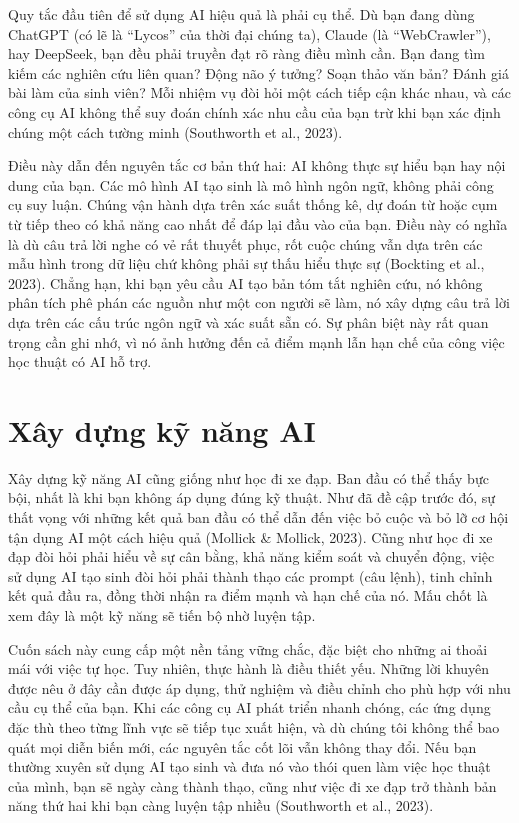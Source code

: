Quy tắc đầu tiên để sử dụng AI hiệu quả là phải cụ thể. Dù bạn đang dùng ChatGPT (có lẽ là ``Lycos'' của thời đại chúng ta), Claude (là ``WebCrawler''), hay DeepSeek, bạn đều phải truyền đạt rõ ràng điều mình cần. Bạn đang tìm kiếm các nghiên cứu liên quan? Động não ý tưởng? Soạn thảo văn bản? Đánh giá bài làm của sinh viên? Mỗi nhiệm vụ đòi hỏi một cách tiếp cận khác nhau, và các công cụ AI không thể suy đoán chính xác nhu cầu của bạn trừ khi bạn xác định chúng một cách tường minh (Southworth et al., 2023).

Điều này dẫn đến nguyên tắc cơ bản thứ hai: AI không thực sự hiểu bạn hay nội dung của bạn. Các mô hình AI tạo sinh là mô hình ngôn ngữ, không phải công cụ suy luận. Chúng vận hành dựa trên xác suất thống kê, dự đoán từ hoặc cụm từ tiếp theo có khả năng cao nhất để đáp lại đầu vào của bạn. Điều này có nghĩa là dù câu trả lời nghe có vẻ rất thuyết phục, rốt cuộc chúng vẫn dựa trên các mẫu hình trong dữ liệu chứ không phải sự thấu hiểu thực sự (Bockting et al., 2023). Chẳng hạn, khi bạn yêu cầu AI tạo bản tóm tắt nghiên cứu, nó không phân tích phê phán các nguồn như một con người sẽ làm, nó xây dựng câu trả lời dựa trên các cấu trúc ngôn ngữ và xác suất sẵn có. Sự phân biệt này rất quan trọng cần ghi nhớ, vì nó ảnh hưởng đến cả điểm mạnh lẫn hạn chế của công việc học thuật có AI hỗ trợ.

\section{Xây dựng kỹ năng AI}

Xây dựng kỹ năng AI cũng giống như học đi xe đạp. Ban đầu có thể thấy bực bội, nhất là khi bạn không áp dụng đúng kỹ thuật. Như đã đề cập trước đó, sự thất vọng với những kết quả ban đầu có thể dẫn đến việc bỏ cuộc và bỏ lỡ cơ hội tận dụng AI một cách hiệu quả (Mollick \& Mollick, 2023). Cũng như học đi xe đạp đòi hỏi phải hiểu về sự cân bằng, khả năng kiểm soát và chuyển động, việc sử dụng AI tạo sinh đòi hỏi phải thành thạo các prompt (câu lệnh), tinh chỉnh kết quả đầu ra, đồng thời nhận ra điểm mạnh và hạn chế của nó. Mấu chốt là xem đây là một kỹ năng sẽ tiến bộ nhờ luyện tập.

Cuốn sách này cung cấp một nền tảng vững chắc, đặc biệt cho những ai thoải mái với việc tự học. Tuy nhiên, thực hành là điều thiết yếu. Những lời khuyên được nêu ở đây cần được áp dụng, thử nghiệm và điều chỉnh cho phù hợp với nhu cầu cụ thể của bạn. Khi các công cụ AI phát triển nhanh chóng, các ứng dụng đặc thù theo từng lĩnh vực sẽ tiếp tục xuất hiện, và dù chúng tôi không thể bao quát mọi diễn biến mới, các nguyên tắc cốt lõi vẫn không thay đổi. Nếu bạn thường xuyên sử dụng AI tạo sinh và đưa nó vào thói quen làm việc học thuật của mình, bạn sẽ ngày càng thành thạo, cũng như việc đi xe đạp trở thành bản năng thứ hai khi bạn càng luyện tập nhiều (Southworth et al., 2023).


